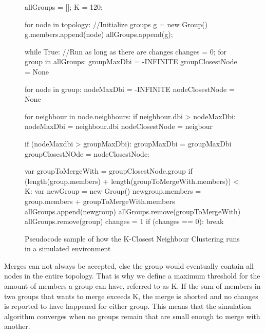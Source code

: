 	\begin{figure}
		\tiny
		\begin{python}
allGroups = [];
K = 120;

for node in topology: //Initialize groups
	g = new Group()
	g.members.append(node)
	allGroups.append(g);

while True: //Run as long as there are changes
	changes = 0;	
	for group in allGroups: 
		groupMaxDbi = -INFINITE
		groupClosestNode = None

		for node in group:
			nodeMaxDbi = -INFINITE
			nodeClosestNode = None

			for neighbour in node.neighbours:
				if neighbour.dbi > nodeMaxDbi:
					nodeMaxDbi = neighbour.dbi
					nodeClosestNode = neigbour

			if (nodeMaxdbi > groupMaxDbi):
				groupMaxDbi = groupMaxDbi
				groupClosestNOde = nodeClosestNode:

		var groupToMergeWith = groupClosestNode.group
		if (length(group.members) + length(groupToMergeWith.members)) < K:
			var newGroup = new Group()
			newgroup.members = group.members + groupToMergeWith.members
			allGroups.append(newgroup)
			allGroups.remove(groupToMergeWith)
			allGroups.remove(group)
			changes = 1
	if (changes == 0):
		break
		\end{python}
			\caption{Pseudocode sample of how the K-Closest Neighbour Clustering runs in a simulated environment}
			\label{fig:groupmerge}
	\end{figure}



Merges can not always be accepted, else the group would eventually contain all nodes in the entire topology. That is why we define a maximum threshold for the amount of members a group can have, 
referred to as K. If the sum of members in two groups that wants to merge exceeds K, the merge is aborted and no changes is reported to have happened for either group. 
This means that the simulation algorithm converges when no groups remain that are small enough to merge with another.
 
